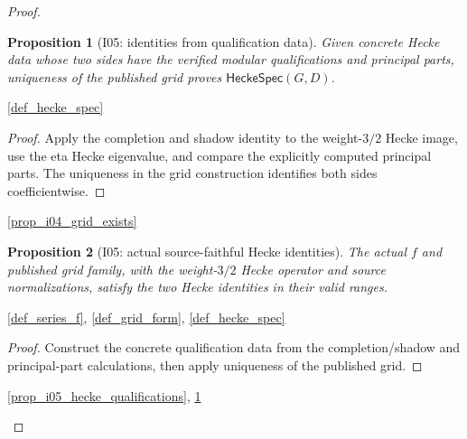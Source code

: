 \documentclass[11pt,a4paper]{article}
\numberwithin{equation}{section}
\theoremstyle{plain}\newtheorem{theorem}{Theorem}[section]\newaliascnt{proposition}{theorem}\newtheorem{proposition}[proposition]{Proposition}\aliascntresetthe{proposition}\newaliascnt{lemma}{theorem}\newtheorem{lemma}[lemma]{Lemma}\aliascntresetthe{lemma}
\theoremstyle{definition}\newaliascnt{definition}{theorem}\newtheorem{definition}[definition]{Definition}\aliascntresetthe{definition}\newaliascnt{notation}{theorem}\newtheorem{notation}[notation]{Notation}\aliascntresetthe{notation}
\providecommand{\lean}[1]{}\providecommand{\leanok}{}
\begin{document}
\begin{proof}
\begin{proposition}[I05: identities from qualification data]\label{prop_i05_hecke_identities}\lean{SptCM.Analytic.Repaired.published_hecke_identities}\leanok
Given concrete Hecke data whose two sides have the verified modular
qualifications and principal parts, uniqueness of the published grid proves
$\mathsf{HeckeSpec}(G,D)$.
\end{proposition}
\begin{uses-statement}\ref{def_hecke_spec}\end{uses-statement}
\begin{proof}
Apply the completion and shadow identity to the weight-$3/2$ Hecke image, use the eta Hecke eigenvalue, and compare the explicitly computed principal parts.  The uniqueness in the grid construction identifies both sides coefficientwise.
\end{proof}
\begin{uses-proof}\ref{prop_i04_grid_exists}\end{uses-proof}

\begin{proposition}[I05: actual source-faithful Hecke identities]\label{prop_i05_actual_hecke_identities}\lean{SptCM.Analytic.Repaired.actual_source_hecke_identities_displayed}\leanok
The actual $f$ and published grid family, with the weight-$3/2$ Hecke operator
and source normalizations, satisfy the two Hecke identities in their valid
ranges.
\end{proposition}
\begin{uses-statement}\ref{def_series_f}, \ref{def_grid_form}, \ref{def_hecke_spec}\end{uses-statement}
\begin{proof}
Construct the concrete qualification data from the completion/shadow and
principal-part calculations, then apply uniqueness of the published grid.
\end{proof}
\begin{uses-proof}\ref{prop_i05_hecke_qualifications}, \ref{prop_i05_hecke_identities}\end{uses-proof}


\end{proof}
\end{document}
